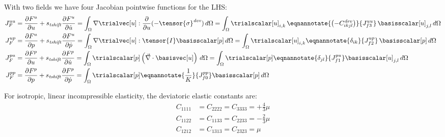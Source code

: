 With two fields we have four Jacobian pointwise functions for the LHS:
\begin{align}
  J_F^{uu} &= \frac{\partial F^u}{\partial u} + s_\mathit{tshift} \frac{\partial F^u}{\partial \dot{u}} =
             \int_\Omega \nabla \trialvec[u] : \frac{\partial}{\partial u}(-\tensor{\sigma}^\mathit{dev}) \, d\Omega 
             = \int_\Omega \trialscalar[u]_{i,k} \, \eqnannotate{\left(-C^\mathit{dev}_{ikjl}\right)} {J_{f3}^{uu}}  \, \basisscalar[u]_{j,l}\, d\Omega \\
  J_F^{up} &= \frac{\partial F^u}{\partial p} + s_\mathit{tshift} \frac{\partial F^u}{\partial \dot{p}} =
             \int_\Omega \nabla\trialvec[u] : \tensor{I} \basisscalar[p] \,  d\Omega
             = \int_\Omega \trialscalar[u]_{i,k} \eqnannotate{\delta_{ik}}{J_{f2}^{up}} \, \basisscalar[p] \, d\Omega \\
  J_F^{pu} &= \frac{\partial F^p}{\partial u} + s_\mathit{tshift} \frac{\partial F^p}{\partial \dot{u}} =
             \int_\Omega \trialscalar[p] \left(\vec{\nabla}  \cdot \basisvec[u]\right) \, d\Omega
             = \int_\Omega \trialscalar[p] \eqnannotate{\delta_{jl}}{J_{f1}^{pu}} \basisscalar[u]_{j,l} \, d\Omega\\
  J_F^{pp} &= \frac{\partial F^p}{\partial p}  + s_\mathit{tshift} \frac{\partial F^p}{\partial \dot{p}} =
             \int_\Omega \trialscalar[p] \eqnannotate{\frac{1} {K}}{J_{f0}^{pp}} \basisscalar[p] \, d\Omega
\end{align}

For isotropic, linear incompressible elasticity, the deviatoric elastic constants are:
\begin{align}
    C_{1111} &= C_{2222} = C_{3333} = +\frac{4}{3} \mu \\
    C_{1122} &= C_{1133} = C_{2233} = -\frac{2}{3} \mu \\
    C_{1212} &= C_{1313} = C_{2323} = \mu
\end{align}
